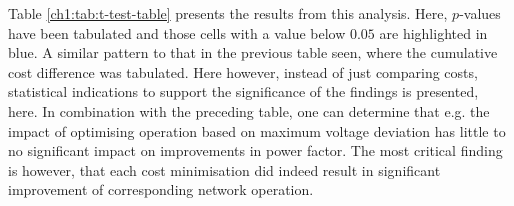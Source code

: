 

Table \ref{ch1:tab:t-test-table} presents the results from this analysis.
Here, $p$-values have been tabulated and those cells with a value below $0.05$ are highlighted in blue.
A similar pattern to that in the previous table seen, where the cumulative cost difference was tabulated.
Here however, instead of just comparing costs, statistical indications to support the significance of the findings is presented, here.
In combination with the preceding table, one can determine that e.g. the impact of optimising operation based on maximum voltage deviation has little to no significant impact on improvements in power factor.
The most critical finding is however, that each cost minimisation did indeed result in significant improvement of corresponding network operation.
